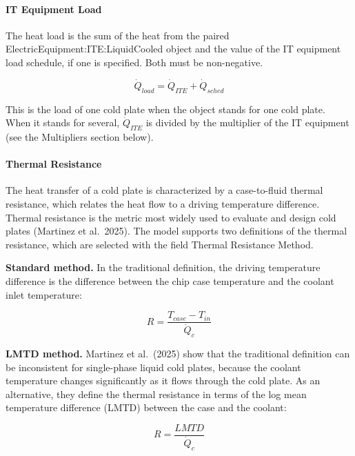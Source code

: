 \paragraph{IT Equipment Load}\label{it-equipment-load-coilcoolingitecoldplate}

The heat load is the sum of the heat from the paired ElectricEquipment:ITE:LiquidCooled object and the value of the IT equipment load schedule, if one is specified. Both must be non-negative.

\begin{equation}
\dot{Q}_{load} = \dot{Q}_{ITE} + \dot{Q}_{sched}
\end{equation}

This is the load of one cold plate when the object stands for one cold plate. When it stands for several, \(\dot{Q}_{ITE}\) is divided by the multiplier of the IT equipment (see the Multipliers section below).

\paragraph{Thermal Resistance}\label{thermal-resistance-coilcoolingitecoldplate}

The heat transfer of a cold plate is characterized by a case-to-fluid thermal resistance, which relates the heat flow to a driving temperature difference. Thermal resistance is the metric most widely used to evaluate and design cold plates (Martinez et al.~2025). The model supports two definitions of the thermal resistance, which are selected with the field Thermal Resistance Method.

\textbf{Standard method.} In the traditional definition, the driving temperature difference is the difference between the chip case temperature and the coolant inlet temperature:

\begin{equation}
R = \frac{T_{case} - T_{in}}{\dot{Q}_{c}}
\end{equation}

\textbf{LMTD method.} Martinez et al.~(2025) show that the traditional definition can be inconsistent for single-phase liquid cold plates, because the coolant temperature changes significantly as it flows through the cold plate. As an alternative, they define the thermal resistance in terms of the log mean temperature difference (LMTD) between the case and the coolant:

\begin{equation}
R = \frac{LMTD}{\dot{Q}_{c}}
\end{equation}

